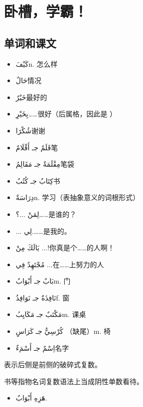 \chapter{卧槽，学霸！}

\section{单词和课文}

\begin{itemize}
    \item \ac{كَيْفَ}{n. 怎么样}
    \item \ac{حَالٌ}{情况}
    \item \ac{خَيْرٌ}{最好的}
    \item \ac{بِخَيْرِِ}{……很好（后属格，因此是 ）}
    \item \ac{شُكْرََا}{谢谢}
    \item \ac{قَلَمٌ جـ أَقْلَامٌ}{笔}
    \item \ac{مِقْلَمَةٌ جـ مَقَالِمُ}{笔袋}
    \item \ac{كِتَابٌ جـ كُتُبٌ}{书}
    \item \ac{دِرَاسَةٌ}{n. 学习（表抽象意义的词根形式）}
    \item \ac{لِمَنْ ...؟}{……是谁的？}
    \item \ac{... لِي.}{……是我的。}
    \item \ac{يَالَكَ مِنْ ...!}{你真是个……的人啊！}
    \item \ac{مُجْتَهِدٌ فِي ...}{在……上努力的人}
    \item \ac{بَابٌ جـ أَبْوَابٌ}{m. 门}
    \item \ac{نَافِذَةٌ جـ نَوَافِذُ}{f. 窗}
    \item \ac{مَكْتَبٌ جـ مَكَايِبُ}{m. 课桌}
    \item \ac{كُرْسِيٌّ جـ كَرَاسِِ }{（缺尾）m. 椅}
    \item \ac{اِسْمٌ جـ أَسْمَءٌ}{名字}
\end{itemize}

表示后侧是前侧的破碎式复数。

书等指物名词复数语法上当成阴性单数看待。

\begin{Arabic}
    \begin{itemize}
        \item هَزِهِ أَبْوَابٌ.
    \end{itemize}
\end{Arabic}

